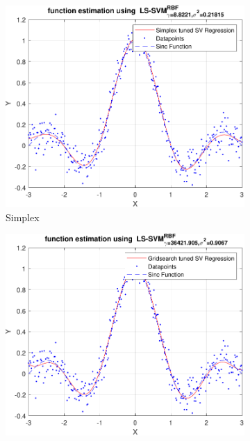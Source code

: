\documentclass{article}
\begin{document}
            
            \begin{figure}[h]
                 \centering
                 \hspace{0.05\textwidth}
                 \begin{subfigure}[b]{0.4\textwidth}
                     \centering
                     \includegraphics[width=\textwidth]{Assignment 2/figures/1_2/rbf_tuning_results_simp.pdf}
                     \caption{Simplex}
                     \label{fig:regression_simplex_tuned}
                 \end{subfigure}
                 \hfill
                 \begin{subfigure}[b]{0.4\textwidth}
                     \centering
                     \includegraphics[width=\textwidth]{Assignment 2/figures/1_2/rbf_tuning_results_grid.pdf}

\end{subfigure}
\end{figure}
\end{document}
